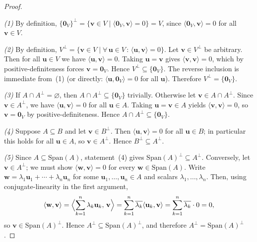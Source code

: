 \documentclass[11pt, a4paper, notitlepage]{report}
\theoremstyle{definition}
\theoremstyle{remark}
\begin{document}
\begin{proof}~

\textit{(1)} By definition,
$\{\mathbf{0}_V\}^\perp = \{\mathbf{v}\in V \mid \langle\mathbf{0}_V,\mathbf{v}\rangle = 0\} = V$,
since $\langle\mathbf{0}_V,\mathbf{v}\rangle = 0$ for all $\mathbf{v}\in V$.

\textit{(2)} By definition,
$V^\perp = \{\mathbf{v}\in V \mid \forall\,\mathbf{u}\in V\,:\, \langle\mathbf{u},\mathbf{v}\rangle = 0\}$.
Let $\mathbf{v}\in V^\perp$ be arbitrary. Then for all $\mathbf{u}\in V$ we have
$\langle\mathbf{u},\mathbf{v}\rangle = 0$. Taking $\mathbf{u} = \mathbf{v}$ gives
$\langle\mathbf{v},\mathbf{v}\rangle = 0$, which by positive-definiteness forces
$\mathbf{v} = \mathbf{0}_V$. Hence $V^\perp \subseteq \{\mathbf{0}_V\}$. The reverse
inclusion is immediate from~(1) (or directly: $\langle\mathbf{u},\mathbf{0}_V\rangle = 0$
for all $\mathbf{u}$). Therefore $V^\perp = \{\mathbf{0}_V\}$.

\textit{(3)} If $A\cap A^\perp = \varnothing$, then $A\cap A^\perp\subseteq\{\mathbf{0}_V\}$
trivially. Otherwise let $\mathbf{v}\in A\cap A^\perp$. Since $\mathbf{v}\in A^\perp$,
we have $\langle\mathbf{u},\mathbf{v}\rangle = 0$ for all $\mathbf{u}\in A$. Taking
$\mathbf{u} = \mathbf{v}\in A$ yields $\langle\mathbf{v},\mathbf{v}\rangle = 0$, so
$\mathbf{v} = \mathbf{0}_V$ by positive-definiteness. Hence $A\cap A^\perp \subseteq \{\mathbf{0}_V\}$.

\textit{(4)} Suppose $A\subseteq B$ and let $\mathbf{v}\in B^\perp$. Then
$\langle\mathbf{u},\mathbf{v}\rangle = 0$ for all $\mathbf{u}\in B$; in particular this holds for
all $\mathbf{u}\in A$, so $\mathbf{v}\in A^\perp$. Hence $B^\perp\subseteq A^\perp$.

\textit{(5)} Since $A\subseteq\mathrm{Span}(A)$, statement~(4) gives
$\mathrm{Span}(A)^\perp\subseteq A^\perp$. Conversely, let $\mathbf{v}\in A^\perp$;
we must show $\langle\mathbf{w},\mathbf{v}\rangle = 0$ for every $\mathbf{w}\in\mathrm{Span}(A)$.
Write $\mathbf{w} = \lambda_1\mathbf{u}_1 + \cdots + \lambda_n\mathbf{u}_n$ for some
$\mathbf{u}_1,\ldots,\mathbf{u}_n\in A$ and scalars $\lambda_1,\ldots,\lambda_n$. Then,
using conjugate-linearity in the first argument,
\[
  \langle\mathbf{w},\mathbf{v}\rangle
  = \Bigl\langle\sum_{k=1}^n\lambda_k\mathbf{u}_k,\,\mathbf{v}\Bigr\rangle
  = \sum_{k=1}^n\overline{\lambda_k}\langle\mathbf{u}_k,\mathbf{v}\rangle
  = \sum_{k=1}^n\overline{\lambda_k}\cdot 0 = 0,
\]
so $\mathbf{v}\in\mathrm{Span}(A)^\perp$. Hence $A^\perp\subseteq\mathrm{Span}(A)^\perp$,
and therefore $A^\perp = \mathrm{Span}(A)^\perp$.
\end{proof}
\end{document}
